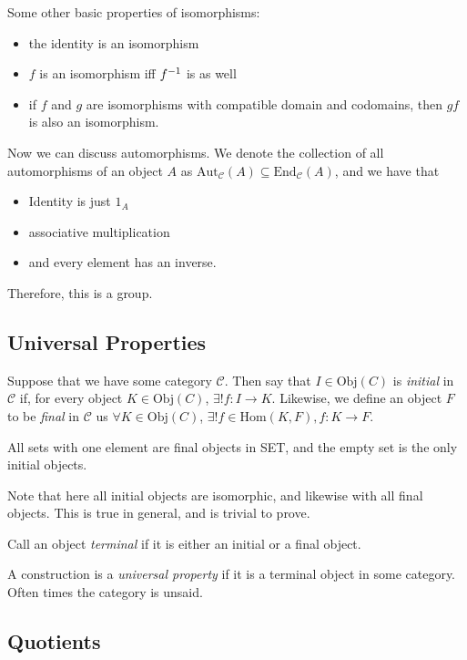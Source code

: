 \documentclass[12pt, twosided]{article}
\begin{document}
Some other basic properties of isomorphisms:

\begin{itemize}
\item the identity is an isomorphism
\item \(f\) is an isomorphism iff \(f^{-1}\) is as well
\item if \(f\) and \(g\) are isomorphisms with compatible domain and codomains, then \(gf\) is also an isomorphism.
\end{itemize}

Now we can discuss automorphisms. We denote the collection of all automorphisms of an object \(A\) as \(\mathrm{Aut}_\mathcal{C}(A) \subseteq \mathrm{End}_\mathcal{C}(A)\), and we have that
\begin{itemize}
\item Identity is just \(1_A\)
\item associative multiplication
\item and every element has an inverse.
\end{itemize}
Therefore, this is a group.

\subsection{Universal Properties}
Suppose that we have some category \(\mathcal{C}\). Then say that \(I \in \mathrm{Obj}(C)\) is \textit{initial} in \(\mathcal{C}\) if, for every object \(K \in \mathrm{Obj}(C)\), \(\exists ! f: I \to K\). Likewise, we define an object \(F\) to be \textit{final} in \(\mathcal{C}\) us \(\forall K \in \mathrm{Obj}(C)\), \(\exists ! f \in \mathrm{Hom}(K, F), f: K \to F\).

\begin{exa}
  All sets with one element are final objects in SET, and the empty set is the only initial objects.

  Note that here all initial objects are isomorphic, and likewise with all final objects. This is true in general, and is trivial to prove.
\end{exa}

Call an object \textit{terminal} if it is either an initial or a final object.

\begin{df}
  A construction is a \textit{universal property} if it is a terminal object in some category. Often times the category is unsaid.
\end{df}

\subsection{Quotients}
\end{document}
